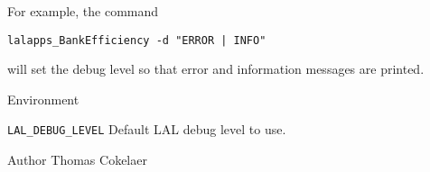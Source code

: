 \begin{entry}
For example, the command
\begin{indented}
\verb$lalapps_BankEfficiency -d "ERROR | INFO"$
\end{indented}
will set the debug level so that error and information messages are printed.

\item[Environment]\leavevmode

\begin{entry}
\item[\texttt{LAL\_DEBUG\_LEVEL}]
Default LAL debug level to use.
\end{entry}

\item[Author]
Thomas Cokelaer

\end{entry}

